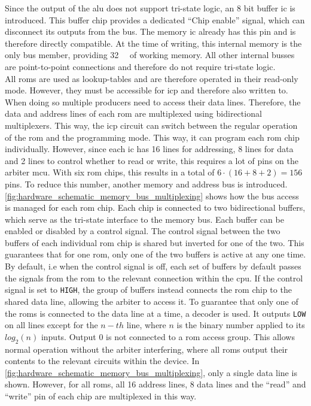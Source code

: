 Since the output of the \ac{alu} does not support tri-state logic, an 8 bit buffer \ac{ic} is introduced. This buffer chip provides a dedicated ``Chip enable'' signal, which can disconnect its outputs from the bus. The memory \ac{ic} already has this pin and is therefore directly compatible. At the time of writing, this internal memory is the only bus member, providing \SI{32}{\kibi\byte} of working memory. All other internal busses are point-to-point connections and therefore do not require tri-state logic.
\\

All \acp{rom} are used as lookup-tables and are therefore operated in their read-only mode. However, they must be accessible for \ac{icp} and therefore also written to. When doing so multiple producers need to access their data lines. Therefore, the data and address lines of each \ac{rom} are multiplexed using bidirectional multiplexers. This way, the \ac{icp} circuit can switch between the regular operation of the \ac{rom} and the programming mode. This way, it can program each \ac{rom} chip individually. However, since each \ac{ic} has 16 lines for addressing, 8 lines for data and 2 lines to control whether to read or write, this requires a lot of pins on the arbiter \ac{mcu}. With six \ac{rom} chips, this results in a total of $6 \cdot (16 + 8 + 2) = 156$ pins. To reduce this number, another memory and address bus is introduced.
\\

\autoref{fig:hardware_schematic_memory_bus_multiplexing} shows how the bus access is managed for each \ac{rom} chip. Each chip is connected to two bidirectional buffers, which serve as the tri-state interface to the memory bus. Each buffer can be enabled or disabled by a control signal. The control signal between the two buffers of each individual \ac{rom} chip is shared but inverted for one of the two. This guarantees that for one \ac{rom}, only one of the two buffers is active at any one time. By default, i.e when the control signal is off, each set of buffers by default passes the signals from the \ac{rom} to the relevant connection within the \ac{cpu}. If the control signal is set to \texttt{HIGH}, the group of buffers instead connects the \ac{rom} chip to the shared data line, allowing the arbiter to access it. To guarantee that only one of the \acp{rom} is connected to the data line at a time, a decoder is used. It outputs \texttt{LOW} on all lines except for the $n-th$ line, where $n$ is the binary number applied to its $log_2(n)$ inputs. Output 0 is not connected to a \ac{rom} access group. This allows normal operation without the arbiter interfering, where all \acp{rom} output their contents to the relevant circuits within the device. In \autoref{fig:hardware_schematic_memory_bus_multiplexing}, only a single data line is shown. However, for all \acp{rom}, all 16 address lines, 8 data lines and the ``read'' and ``write'' pin of each chip are multiplexed in this way.
\\

